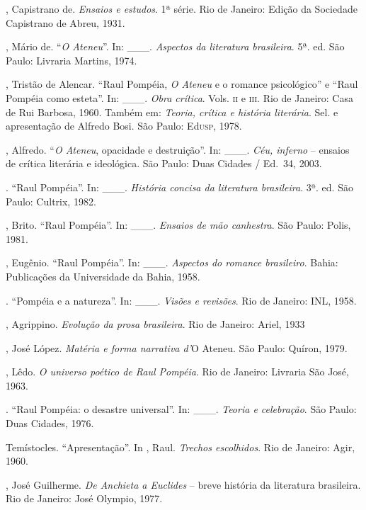 \begin{bibliohedra}
, Capistrano de. \textit{Ensaios e estudos}.
1ª série. Rio de Janeiro: Edição da Sociedade
Capistrano de Abreu, 1931.

, Mário de. ``\textit{O Ateneu}''. In: \_\_\_. \textit{Aspectos da
literatura brasileira}. 5ª. ed. São Paulo: Livraria
Martins, 1974.

, Tristão de Alencar. ``Raul Pompéia,
\textit{O Ateneu} e o romance psicológico'' e ``Raul Pompéia como
esteta''. In: \_\_\_. \textit{Obra crítica}. Vols. \textsc{ii} e \textsc{iii}. Rio de
Janeiro: Casa de Rui Barbosa, 1960. Também em: \textit{Teoria, crítica
e história literária}. Sel. e apresentação de Alfredo Bosi. São Paulo:
Ed\textsc{usp}, 1978.  

, Alfredo. ``\textit{O Ateneu}, opacidade e
destruição''. In: \_\_\_. \textit{Céu, inferno} -- ensaios de crítica
literária e ideológica. São Paulo: Duas Cidades / Ed.~34, 2003.

\titidem. ``Raul Pompéia''. In: \_\_\_. \textit{História concisa da
literatura brasileira}. 3ª. ed. São Paulo: Cultrix,
1982.

, Brito. ``Raul Pompéia''. In: \_\_\_. 
\textit{Ensaios de mão canhestra}. São Paulo: Polis, 1981.

, Eugênio. ``Raul Pompéia''. In: \_\_\_.
\textit{Aspectos do romance brasileiro}. Bahia: Publicações da
Universidade da Bahia, 1958.

\titidem. ``Pompéia e a natureza''. In: \_\_\_. \textit{Visões e
revisões}. Rio de Janeiro: INL, 1958.

, Agrippino. \textit{Evolução da prosa brasileira}. Rio
de Janeiro: Ariel, 1933

, José López. \textit{Matéria e forma narrativa
d'}O Ateneu. São Paulo: Quíron, 1979.

, Lêdo. \textit{O universo poético de Raul Pompéia}.
Rio de Janeiro: Livraria São José, 1963.

\titidem. ``Raul Pompéia: o desastre universal''. In: \_\_\_.
\textit{Teoria e celebração}. São Paulo: Duas Cidades, 1976.

 Temístocles. ``Apresentação''. In , Raul.
\textit{Trechos escolhidos}. Rio de Janeiro: Agir, 1960.

, José Guilherme. \textit{De Anchieta a Euclides} -- breve
história da literatura brasileira. Rio de Janeiro: José Olympio, 1977.


\end{bibliohedra}
